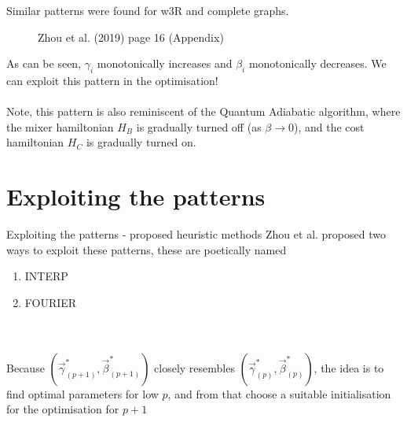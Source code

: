 \documentclass{beamer}
\begin{document}
\begin{frame}
	Similar patterns were found for w3R and complete graphs.
	\begin{figure}%
		\centering
		\qquad 
		\caption{Zhou et al. (2019) page 16 (Appendix)}
	\end{figure}
As can be seen, $\gamma_i$ monotonically increases and $\beta_i$ monotonically decreases. We can exploit this pattern in the optimisation!
\\~\\
Note, this pattern is also reminiscent of the Quantum Adiabatic algorithm, where the mixer hamiltonian $H_B$ is gradually turned off (as $\beta \to 0$), and the cost hamiltonian $H_C$ is gradually turned on.
\end{frame}

\section{Exploiting the patterns}
\begin{frame}{Exploiting the patterns - proposed heuristic methods}
	Zhou et al. proposed two ways to exploit these patterns, these are poetically named
	\begin{enumerate}
		\item INTERP
		\item FOURIER
	\end{enumerate}
	\mbox{ }\\~\\
	Because
	$(\vec{\gamma}^*_{(p+1)}, \vec{\beta}^*_{(p+1)})$ closely resembles $(\vec{\gamma}^*_{(p)}, \vec{\beta}^*_{(p)})$, the idea is to find optimal parameters for low $p$, and from that choose a suitable initialisation for the optimisation for $p+1$ 
\end{frame}
\end{document}
